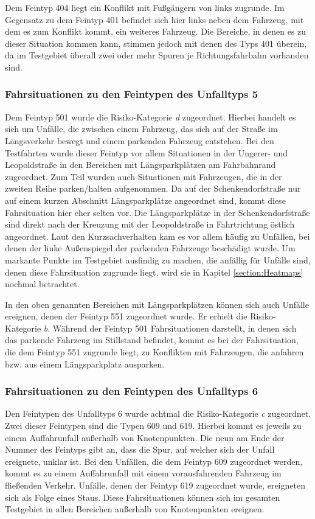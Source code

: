 Dem Feintyp 404 liegt ein Konflikt mit Fußgängern von links zugrunde. Im Gegensatz zu dem Feintyp 401 befindet sich hier links neben dem Fahrzeug, mit dem es zum Konflikt kommt, ein weiteres Fahrzeug. Die Bereiche, in denen es zu dieser Situation kommen kann, stimmen jedoch mit denen des Typs 401 überein, da im Testgebiet überall zwei oder mehr Spuren je Richtungsfahrbahn vorhanden sind. 

\subsubsection{Fahrsituationen zu den Feintypen des Unfalltyps 5}
Dem Feintyp 501 wurde die Risiko-Kategorie \textit{d} zugeordnet. Hierbei handelt es sich um Unfälle, die zwischen einem Fahrzeug, das sich auf der Straße im Längsverkehr bewegt und einem parkenden Fahrzeug entstehen. Bei den Testfahrten wurde dieser Feintyp vor allem Situationen in der Ungerer- und Leopoldstraße in den Bereichen mit Längsparkplätzen am Fahrbahnrand zugeordnet.  Zum Teil wurden auch Situationen mit Fahrzeugen, die in der zweiten Reihe parken/halten aufgenommen. Da auf der Schenkendorfstraße nur auf einem kurzen Abschnitt Längsparkplätze angeordnet sind, kommt diese Fahrsituation hier eher selten vor. Die Längsparkplätze in der Schenkendorfstraße sind direkt nach der Kreuzung mit der Leopoldstraße in Fahrtrichtung östlich angeordnet. Laut den Kurzsachverhalten kam es vor allem häufig zu Unfällen, bei denen der linke Außenspiegel der parkenden Fahrzeuge beschädigt wurde. Um markante Punkte im Testgebiet ausfindig zu machen, die anfällig für Unfälle sind, denen diese Fahrsituation zugrunde liegt, wird sie in Kapitel \ref{section:Heatmaps} nochmal betrachtet.

In den oben genannten Bereichen mit Längsparkplätzen können sich auch Unfälle ereignen, denen der Feintyp 551 zugeordnet wurde. Er erhielt die Risiko-Kategorie \textit{b}. Während der Feintyp 501 Fahrsituationen darstellt, in denen sich das parkende Fahrzeug im Stillstand befindet, kommt es bei der Fahrsituation, die dem Feintyp 551 zugrunde liegt, zu Konflikten mit Fahrzeugen, die anfahren bzw. aus einem Längsparkplatz ausparken.

\subsubsection{Fahrsituationen zu den Feintypen des Unfalltyps 6}
Den Feintypen des Unfalltyps 6 wurde achtmal die Risiko-Kategorie \textit{c} zugeordnet. Zwei dieser Feintypen sind die Typen 609 und 619. Hierbei kommt es jeweils zu einem Auffahrunfall außerhalb von Knotenpunkten. Die neun am Ende der Nummer des Feintyps gibt an, dass die Spur, auf welcher sich der Unfall ereignete, unklar ist. Bei den Unfällen, die dem Feintyp 609 zugeordnet werden, kommt es zu einem Auffahrunfall mit einem vorausfahrenden Fahrzeug im fließenden Verkehr. Unfälle, denen der Feintyp 619 zugeordnet wurde, ereigneten sich als Folge eines Staus. Diese Fahrsituationen können sich im gesamten Testgebiet in allen Bereichen außerhalb von Knotenpunkten ereignen.

